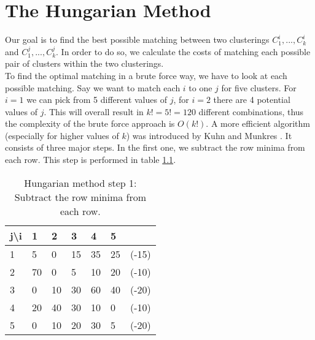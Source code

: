 \chapter{The Hungarian Method}
\label{sec:hungarian}

Our goal is to find the best possible matching between two clusterings $C_1^i, ..., C_k^i$ and $C_1^j, ..., C_k^j$. In order to do so, we calculate the costs of matching each possible pair of clusters within the two clusterings.\\


To find the optimal matching in a brute force way, we have to look at each possible matching. Say we want to match each $i$ to one $j$ for five clusters. For $i = 1$ we can pick from 5 different values of $j$, for $i = 2$ there are 4 potential values of $j$. This will overall result in $k! = 5! = 120$ different combinations, thus the complexity of the brute force approach is $O(k!)$. A more efficient algorithm (especially for higher values of $k$) was introduced by Kuhn and Munkres \cite{kuhn1955hungarian}\cite{munkres1957algorithms}. It consists of three major steps. In the first one, we subtract the row minima from each row. This step is performed in table \ref{app:hung:step1}.

\begin{table}[h]
    \centering
    \begin{tabular}{|l | l l l l l| l |}
    \hline
    j\textbackslash i & 1 & 2 & 3 & 4 & 5 & \\ \hline
    1 & 5 & 0 & 15 & 35 & 25 & (-15)\\
    2 & 70 & 0 & 5 & 10 & 20 & (-10)\\
    3 & 0 & 10 & 30 & 60 & 40 & (-20)\\
    4 & 20 & 40 & 30 & 10 & 0 & (-10)\\
    5 & 0 & 10 & 20 & 30 & 5 & (-20)\\ \hline
    \end{tabular}
    \caption{Hungarian method step 1: Subtract the row minima from each row.}
    \label{app:hung:step1}
\end{table}

